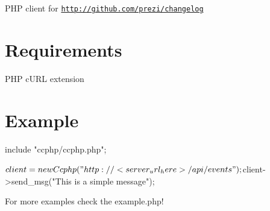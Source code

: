 P\-H\-P client for \href{http://github.com/prezi/changelog}{\tt http\-://github.\-com/prezi/changelog}

\section*{Requirements }


\begin{DoxyItemize}
\item P\-H\-P c\-U\-R\-L extension
\end{DoxyItemize}

\section*{Example }

\begin{DoxyVerb}include "ccphp/ccphp.php";

$client = new Ccphp("http://<server_url_here>/api/events");
$client->send_msg("This is a simple message");
\end{DoxyVerb}


For more examples check the {\ttfamily example.\-php}! 